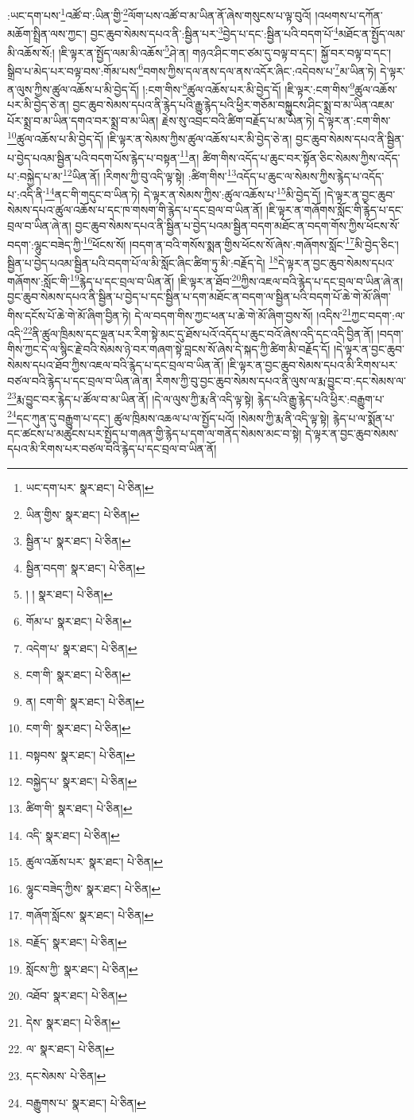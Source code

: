 :ཡང་དག་པས་\footnote{ཡང་དག་པར་  སྣར་ཐང་།  པེ་ཅིན། }འཚོ་བ་:ཡིན་གྱི་\footnote{ཡིན་གྱིས་  སྣར་ཐང་།  པེ་ཅིན། }ལོག་པས་འཚོ་བ་མ་ཡིན་ནོ་ཞེས་གསུངས་པ་ལྟ་བུའོ། །འཕགས་པ་དཀོན་མཆོག་སྤྲིན་ལས་ཀྱང་། བྱང་ཆུབ་སེམས་དཔའ་ནི་:སྦྱིན་པར་\footnote{སྦྱིན་པ་  སྣར་ཐང་།  པེ་ཅིན། }བྱེད་པ་དང་:སྦྱིན་པའི་བདག་པོ་\footnote{སྦྱིན་བདག་  སྣར་ཐང་།  པེ་ཅིན། }མཐོང་ན་སྤྱོད་ལམ་མི་འཆོས་སོ:། །ཇི་ལྟར་ན་སྤྱོད་ལམ་མི་འཆོས་\footnote{། །  སྣར་ཐང་།  པེ་ཅིན། }ཤེ་ན། གཉའ་ཤིང་གང་ཙམ་དུ་བལྟ་བ་དང་། སྐྱོ་བར་བལྟ་བ་དང་། སྒྲིབ་པ་མེད་པར་བལྟ་བས་:གོམ་པས་\footnote{གོམ་པ་  སྣར་ཐང་།  པེ་ཅིན། }བགས་ཀྱིས་དལ་ནས་དལ་ནས་འདོར་ཞིང་:འདེབས་པ་\footnote{འདེག་པ་  སྣར་ཐང་།  པེ་ཅིན། }མ་ཡིན་ཏེ། དེ་ལྟར་ན་ལུས་ཀྱིས་ཚུལ་འཆོས་པ་མི་བྱེད་དོ། །:ངག་གིས་\footnote{ངག་གི་  སྣར་ཐང་།  པེ་ཅིན། }ཚུལ་འཆོས་པར་མི་བྱེད་དོ། །ཇི་ལྟར་:ངག་གིས་\footnote{ན། ངག་གི་  སྣར་ཐང་།  པེ་ཅིན། }ཚུལ་འཆོས་པར་མི་བྱེད་ཅེ་ན། བྱང་ཆུབ་སེམས་དཔའ་ནི་རྙེད་པའི་རྒྱུ་རྙེད་པའི་ཕྱིར་གཅོམ་བསྐྱུངས་ཤིང་སྨྲ་བ་མ་ཡིན་འཇམ་པོར་སྨྲ་བ་མ་ཡིན་དགའ་བར་སྨྲ་བ་མ་ཡིན། རྗེས་སུ་འབྲང་བའི་ཚིག་བརྗོད་པ་མ་ཡིན་ཏེ། དེ་ལྟར་ན་:ངག་གིས་\footnote{ངག་གི་  སྣར་ཐང་།  པེ་ཅིན། }ཚུལ་འཆོས་པ་མི་བྱེད་དོ། །ཇི་ལྟར་ན་སེམས་ཀྱིས་ཚུལ་འཆོས་པར་མི་བྱེད་ཅེ་ན། བྱང་ཆུབ་སེམས་དཔའ་ནི་སྦྱིན་པ་བྱེད་པའམ་སྦྱིན་པའི་བདག་པོས་རྙེད་པ་བསྟན་\footnote{བསྟབས་  སྣར་ཐང་།  པེ་ཅིན། }ན། ཚིག་གིས་འདོད་པ་ཆུང་བར་སྟོན་ཅིང་སེམས་ཀྱིས་འདོད་པ་:བསྐྱེད་པ་མ་\footnote{བསྐྱེད་པ་  སྣར་ཐང་།  པེ་ཅིན། }ཡིན་ནོ། །རིགས་ཀྱི་བུ་འདི་ལྟ་སྟེ། :ཚིག་གིས་\footnote{ཚིག་གི་  སྣར་ཐང་།  པེ་ཅིན། }འདོད་པ་ཆུང་ལ་སེམས་ཀྱིས་རྙེད་པ་འདོད་པ་:འདི་ནི་\footnote{འདི་  སྣར་ཐང་།  པེ་ཅིན། }ནང་གི་གདུང་བ་ཡིན་ཏེ། དེ་ལྟར་ན་སེམས་ཀྱིས་:ཚུལ་འཆོས་པ་\footnote{ཚུལ་འཆོས་པར་  སྣར་ཐང་།  པེ་ཅིན། }མི་བྱེད་དོ། །དེ་ལྟར་ན་བྱང་ཆུབ་སེམས་དཔའ་ཚུལ་འཆོས་པ་དང་ཁ་གསག་གི་རྙེད་པ་དང་བྲལ་བ་ཡིན་ནོ། །ཇི་ལྟར་ན་གཞོགས་སློང་གི་རྙེད་པ་དང་བྲལ་བ་ཡིན་ཞེ་ན། བྱང་ཆུབ་སེམས་དཔའ་ནི་སྦྱིན་པ་བྱེད་པའམ་སྦྱིན་བདག་མཐོང་ན་བདག་གོས་ཀྱིས་ཕོངས་སོ་བདག་:ལྷུང་བཟེད་ཀྱི་\footnote{ལྷུང་བཟེད་ཀྱིས་  སྣར་ཐང་།  པེ་ཅིན། }ཕོངས་སོ། །བདག་ན་བའི་གསོས་སྨན་གྱིས་ཕོངས་སོ་ཞེས་:གཞོགས་སློང་\footnote{གཞོག་སློངས་  སྣར་ཐང་།  པེ་ཅིན། }མི་བྱེད་ཅིང་། སྦྱིན་པ་བྱེད་པའམ་སྦྱིན་པའི་བདག་པོ་ལ་མི་སློང་ཞིང་ཚིག་ཏུ་མི་:བརྗོད་དེ། \footnote{བརྗོད་  སྣར་ཐང་།  པེ་ཅིན། }དེ་ལྟར་ན་བྱང་ཆུབ་སེམས་དཔའ་གཞོགས་:སློང་གི་\footnote{སློངས་ཀྱི་  སྣར་ཐང་།  པེ་ཅིན། }རྙེད་པ་དང་བྲལ་བ་ཡིན་ནོ། །ཇི་ལྟར་ན་ཐོབ་\footnote{འཐོབ་  སྣར་ཐང་།  པེ་ཅིན། }ཀྱིས་འཇལ་བའི་རྙེད་པ་དང་བྲལ་བ་ཡིན་ཞེ་ན། བྱང་ཆུབ་སེམས་དཔའ་ནི་སྦྱིན་པ་བྱེད་པ་དང་སྦྱིན་པ་དག་མཐོང་ན་བདག་ལ་སྦྱིན་པའི་བདག་པོ་ཆེ་གེ་མོ་ཞིག་གིས་དངོས་པོ་ཆེ་གེ་མོ་ཞིག་བྱིན་ཏེ། དེ་ལ་བདག་གིས་ཀྱང་ཕན་པ་ཆེ་གེ་མོ་ཞིག་བྱས་སོ། །འདིས་\footnote{དེས་  སྣར་ཐང་།  པེ་ཅིན། }ཀྱང་བདག་:ལ་འདི་\footnote{ལ་  སྣར་ཐང་།  པེ་ཅིན། }ནི་ཚུལ་ཁྲིམས་དང་ལྡན་པར་རིག་སྟེ་མང་དུ་ཐོས་པའོ་འདོད་པ་ཆུང་བའོ་ཞེས་འདི་དང་འདི་བྱིན་ནོ། །བདག་གིས་ཀྱང་དེ་ལ་སྙིང་རྗེ་བའི་སེམས་ཉེ་བར་གཞག་སྟེ་བླངས་སོ་ཞེས་དེ་སྐད་ཀྱི་ཚིག་མི་བརྗོད་དོ། །དེ་ལྟར་ན་བྱང་ཆུབ་སེམས་དཔའ་ཐོབ་ཀྱིས་འཇལ་བའི་རྙེད་པ་དང་བྲལ་བ་ཡིན་ནོ། །ཇི་ལྟར་ན་བྱང་ཆུབ་སེམས་དཔའ་མི་རིགས་པར་བཙལ་བའི་རྙེད་པ་དང་བྲལ་བ་ཡིན་ཞེ་ན། རིགས་ཀྱི་བུ་བྱང་ཆུབ་སེམས་དཔའ་ནི་ལུས་ལ་རྨ་བྱུང་བ་:དང་སེམས་ལ་\footnote{དང་སེམས་  པེ་ཅིན། }རྨ་བྱུང་བར་རྙེད་པ་ཚོལ་བ་མ་ཡིན་ནོ། །དེ་ལ་ལུས་ཀྱི་རྨ་ནི་འདི་ལྟ་སྟེ། རྙེད་པའི་རྒྱུ་རྙེད་པའི་ཕྱིར་:བརྒྱུག་པ་\footnote{བརྒྱུགས་པ་  སྣར་ཐང་།  པེ་ཅིན། }དང་ཀུན་དུ་བརྒྱུག་པ་དང་། ཚུལ་ཁྲིམས་འཆལ་པ་ལ་སྤྱོད་པའོ། །སེམས་ཀྱི་རྨ་ནི་འདི་ལྟ་སྟེ། རྙེད་པ་ལ་སྨོན་པ་དང་ཚངས་པ་མཚུངས་པར་སྤྱོད་པ་གཞན་གྱི་རྙེད་པ་དག་ལ་གནོད་སེམས་མང་བ་སྟེ། དེ་ལྟར་ན་བྱང་ཆུབ་སེམས་དཔའ་མི་རིགས་པར་བཙལ་བའི་རྙེད་པ་དང་བྲལ་བ་ཡིན་ནོ། 